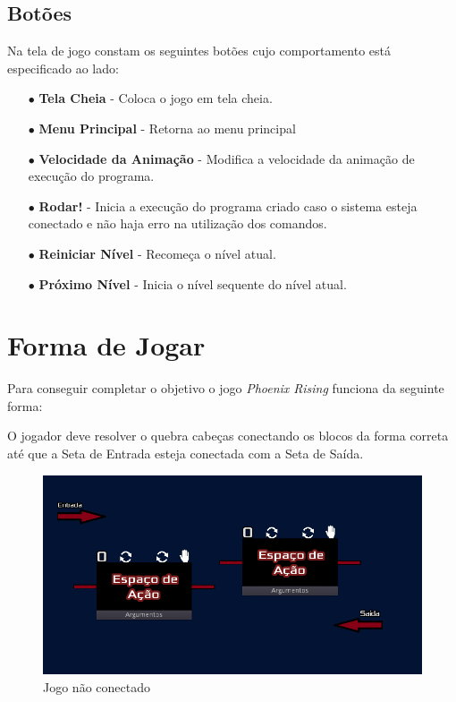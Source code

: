 \subsection{Botões}

Na tela de jogo constam os seguintes botões cujo comportamento está especificado
ao lado:

\begin{itemize}
    \item[$\bullet$]
        \textbf{Tela Cheia} - Coloca o jogo em tela cheia.
    \item[$\bullet$] 
        \textbf{Menu Principal} - Retorna ao menu principal
    \item[$\bullet$] 
        \textbf{Velocidade da Animação} - Modifica a velocidade da animação de execução
        do programa.
    \item[$\bullet$]
        \textbf{Rodar!} - Inicia a execução do programa criado caso o sistema esteja
        conectado e não haja erro na utilização dos comandos.
    \item[$\bullet$]
        \textbf{Reiniciar Nível} - Recomeça o nível atual.
    \item[$\bullet$]
        \textbf{Próximo Nível} - Inicia o nível sequente do nível atual.
\end{itemize}

\section{Forma de Jogar}
\label{sec:consideracoes_preliminares}

Para conseguir completar o objetivo o jogo \textit{Phoenix Rising} funciona
da seguinte forma:

O jogador deve resolver o quebra cabeças conectando os blocos da forma correta
até que a Seta de Entrada esteja conectada com a Seta de Saída.

\begin{figure}[H]
    \includegraphics[width=\textwidth]{../figuras/jogo_nao_conectado.png}
    \caption{Jogo não conectado}
\end{figure}

